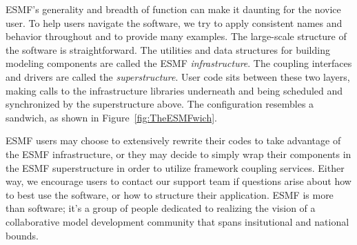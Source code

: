 ESMF's generality and breadth of function can make it daunting for the
novice user.  To help users navigate the software, we try to apply
consistent names and behavior throughout and to provide many examples.
The large-scale structure of the software is straightforward.
The utilities and data structures for building modeling components 
are called the ESMF {\it infrastructure}.  The coupling interfaces and
drivers are called the {\it superstructure}.  User code sits between
these two layers, making calls to the infrastructure
libraries underneath and being scheduled and synchronized by the 
superstructure above.  The configuration resembles a sandwich, as
shown in Figure~\ref{fig:TheESMFwich}.

ESMF users may choose to extensively rewrite their codes
to take advantage of the ESMF infrastructure, or they may decide to
simply wrap their components in the ESMF superstructure in order to
utilize framework coupling services.  Either way, we encourage users
to contact our support team if questions arise about how to best
use the software, or how to structure their application.  ESMF is
more than software;  it's a group of people dedicated to realizing
the vision of a collaborative model development community that spans
insitutional and national bounds.

